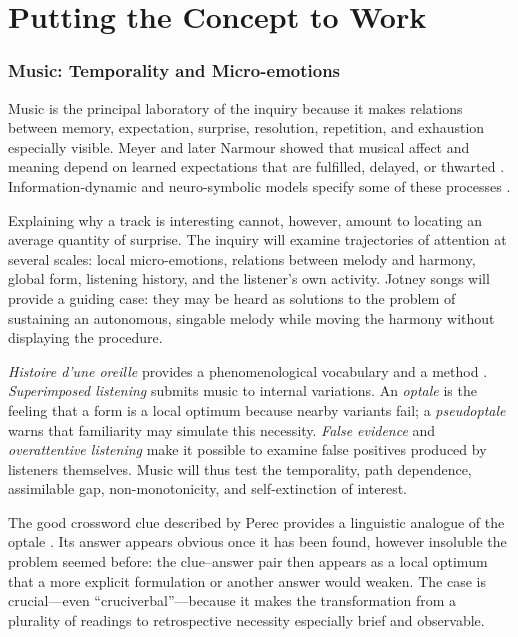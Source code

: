 \documentclass[11pt,a4paper]{article}
\begin{document}
\part{Putting the Concept to Work}

\section{Music: Temporality and Micro-emotions}

Music is the principal laboratory of the inquiry because it makes relations
between memory, expectation, surprise, resolution, repetition, and exhaustion
especially visible. Meyer and later Narmour showed that musical affect and
meaning depend on learned expectations that are fulfilled, delayed, or thwarted
\parencite{meyer1956emotion,narmour1990basic,narmour1992complexity}.
Information-dynamic and neuro-symbolic models specify some of these processes
\parencite{abdallah2009information,berger1999expectations,gang1999unified}.

Explaining why a track is interesting cannot, however, amount to locating an
average quantity of surprise. The inquiry will examine trajectories of
attention at several scales: local micro-emotions, relations between melody and
harmony, global form, listening history, and the listener's own activity.
Jotney songs will provide a guiding case: they may be heard as solutions to the
problem of sustaining an autonomous, singable melody while moving the harmony
without displaying the procedure.

\emph{Histoire d'une oreille} provides a phenomenological vocabulary and a
method \parencite{pachet2018oreille}. \emph{Superimposed listening} submits
music to internal variations. An \emph{optale} is the feeling that a form is a
local optimum because nearby variants fail; a \emph{pseudoptale} warns that
familiarity may simulate this necessity. \emph{False evidence} and
\emph{overattentive listening} make it possible to examine false positives
produced by listeners themselves. Music will thus test the temporality, path
dependence, assimilable gap, non-monotonicity, and self-extinction of interest.

The good crossword clue described by Perec provides a linguistic analogue of
the optale \parencite{perec1999motscroises}. Its answer appears obvious once it
has been found, however insoluble the problem seemed before: the clue--answer pair then
appears as a local optimum that a more explicit formulation or another answer
would weaken. The case is crucial---even ``cruciverbal''---because it makes the
transformation from a plurality of readings to retrospective necessity
especially brief and observable.
\end{document}
